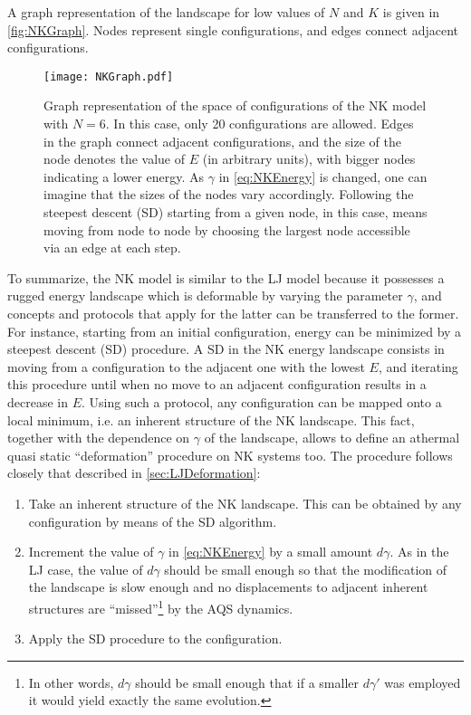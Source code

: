 A graph representation of the landscape for low values of $N$ and $K$ is given in \autoref{fig:NKGraph}. Nodes represent single configurations, and edges connect adjacent configurations. 
\begin{figure}
\centering 
\texttt{[image: NKGraph.pdf]} 
\caption{Graph representation of the space of configurations of the NK model with $N=6$. In this case, only 20 configurations are allowed. Edges in the graph connect adjacent configurations, and the size of the node denotes the value of $E$ (in arbitrary units), with bigger nodes indicating a lower energy. As $\gamma$ in \autoref{eq:NKEnergy} is changed, one can imagine that the sizes of the nodes vary accordingly. Following the steepest descent (SD) starting from a given node, in this case, means moving from node to node by choosing the largest node accessible via an edge at each step.\label{fig:NKGraph}}
\end{figure}
To summarize, the NK model is similar to the LJ model because it possesses a rugged energy landscape which is deformable by varying the parameter $\gamma$, and concepts and protocols that apply for the latter can be transferred to the former.
For instance, starting from an initial configuration, energy can be minimized by a steepest descent (SD) procedure. A SD in the NK energy landscape consists in moving from a configuration to the adjacent one with the lowest $E$, and iterating this procedure until when no move to an adjacent configuration results in a decrease in $E$. Using such a protocol, any configuration can be mapped onto a local minimum, i.e. an inherent structure of the NK landscape. This fact, together with the dependence on $\gamma$ of the landscape, allows to define an athermal quasi static ``deformation'' procedure on NK systems too. The procedure follows closely that described in \autoref{sec:LJDeformation}:
\begin{enumerate}
	\item Take an inherent structure of the NK landscape. This can be obtained by any configuration by means of the SD algorithm.
	\item Increment the value of $\gamma$ in \autoref{eq:NKEnergy} by a small amount $d\gamma$. As in the LJ case, the value of $d\gamma$ should be small enough so that the modification of the landscape is slow enough and no displacements to adjacent inherent structures are ``missed''\footnote{In other words, $d\gamma$ should be small enough that if a smaller $d\gamma'$ was employed it would yield exactly the same evolution.} by the AQS dynamics.
	\item Apply the SD procedure to the configuration.
\end{enumerate}

